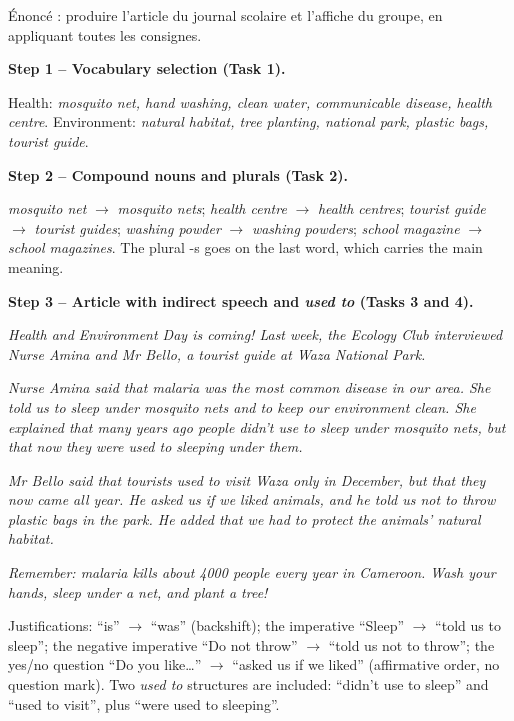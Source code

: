\documentclass[11pt]{article}
\begin{document}
\begin{exoresolu}
Énoncé : produire l'article du journal scolaire et l'affiche du groupe, en appliquant toutes les consignes.

\tcblower

\textbf{Step 1 -- Vocabulary selection (Task 1).}

Health: \emph{mosquito net, hand washing, clean water, communicable disease, health centre}. Environment: \emph{natural habitat, tree planting, national park, plastic bags, tourist guide}.

\textbf{Step 2 -- Compound nouns and plurals (Task 2).}

\emph{mosquito net} $\rightarrow$ \emph{mosquito nets}; \emph{health centre} $\rightarrow$ \emph{health centres}; \emph{tourist guide} $\rightarrow$ \emph{tourist guides}; \emph{washing powder} $\rightarrow$ \emph{washing powders}; \emph{school magazine} $\rightarrow$ \emph{school magazines}. The plural -s goes on the last word, which carries the main meaning.

\textbf{Step 3 -- Article with indirect speech and \emph{used to} (Tasks 3 and 4).}

\emph{Health and Environment Day is coming! Last week, the Ecology Club interviewed Nurse Amina and Mr Bello, a tourist guide at Waza National Park.}

\emph{Nurse Amina said that malaria was the most common disease in our area. She told us to sleep under mosquito nets and to keep our environment clean. She explained that many years ago people didn't use to sleep under mosquito nets, but that now they were used to sleeping under them.}

\emph{Mr Bello said that tourists used to visit Waza only in December, but that they now came all year. He asked us if we liked animals, and he told us not to throw plastic bags in the park. He added that we had to protect the animals' natural habitat.}

\emph{Remember: malaria kills about \num{4000} people every year in Cameroon. Wash your hands, sleep under a net, and plant a tree!}

Justifications: ``is'' $\rightarrow$ ``was'' (backshift); the imperative ``Sleep'' $\rightarrow$ ``told us to sleep''; the negative imperative ``Do not throw'' $\rightarrow$ ``told us not to throw''; the yes/no question ``Do you like\ldots'' $\rightarrow$ ``asked us if we liked'' (affirmative order, no question mark). Two \emph{used to} structures are included: ``didn't use to sleep'' and ``used to visit'', plus ``were used to sleeping''.


\end{exoresolu}
\end{document}
